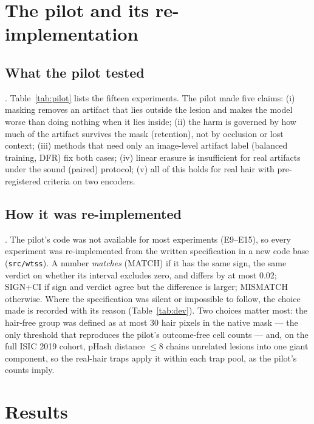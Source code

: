 \section{The pilot and its re-implementation}
\subsection{What the pilot tested}
.
Table~\ref{tab:pilot} lists the fifteen experiments. The pilot made five claims: (i) masking removes an artifact that
lies outside the lesion and makes the model worse than doing nothing when it lies inside; (ii) the harm is governed by
how much of the artifact survives the mask (retention), not by occlusion or lost context; (iii) methods that need
only an image-level artifact label (balanced training, DFR) fix both cases; (iv) linear erasure is insufficient for
real artifacts under the sound (paired) protocol; (v) all of this holds for real hair with pre-registered criteria on
two encoders.


\subsection{How it was re-implemented}
. The pilot's code was not available for
most experiments (E9--E15), so every experiment was re-implemented from the written specification in a new code base
(\texttt{src/wtss}). A number \emph{matches} (MATCH) if it has the same sign, the same verdict on whether its interval
excludes zero, and differs by at most 0.02; SIGN+CI if sign and verdict agree but the difference is larger; MISMATCH
otherwise. Where the specification was silent or impossible to follow, the choice made is recorded with its reason
(Table~\ref{tab:dev}). Two choices matter most: the hair-free group was defined as at most 30 hair pixels in the native
mask --- the only threshold that reproduces the pilot's outcome-free cell counts --- and, on the full ISIC 2019
cohort, pHash distance $\le8$ chains unrelated lesions into one giant component, so the real-hair traps apply it within
each trap pool, as the pilot's counts imply.


\section{Results}
